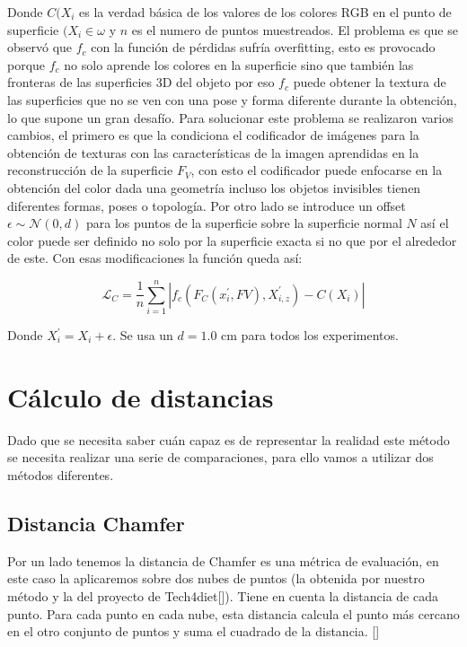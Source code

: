 Donde $C(X_{i}$ es la verdad básica de los valores de los colores RGB en el punto de superficie $(X_{i} \in \omega$ y $n$ es el numero de puntos muestreados. El problema es que se observó que $f_{c}$ con la función de pérdidas sufría overfitting, esto es provocado porque $f_{c}$ no solo aprende los colores en la superficie sino que también las fronteras de las superficies 3D del objeto por eso $f_{c}$ puede obtener la textura de las  superficies que no se ven con una pose y forma diferente durante la obtención, lo que supone un gran desafío. Para solucionar este problema se realizaron varios cambios, el primero es que la condiciona el codificador de imágenes para la obtención de texturas con las características de la imagen aprendidas en la reconstrucción de la superficie $F_{V}$, con esto el codificador puede enfocarse en la obtención del color dada una geometría incluso los objetos invisibles tienen diferentes formas, poses o topología. Por otro lado se introduce un offset $\epsilon \sim \mathcal{N}(0, d)$ para los puntos de la superficie sobre la superficie normal $N$ así el color puede ser definido no solo por la superficie exacta si no que por el alrededor de este. Con esas modificaciones la función queda así:

\begin{equation}
	\label{eq:5}
	\mathcal{L}_{C} = \frac{1}{n} 
	\sum_{i=1}^{n} | f_{c} (F_{C}(x_{i}^{'}, F{V}), X_{i,z}^{'}) - C(X_{i}) |
\end{equation}

Donde $ X_{i}^{'} = X_{i} + \epsilon$. Se usa un $d = 1.0$ cm para todos los experimentos.

\section{Cálculo de distancias}

Dado que se necesita saber cuán capaz es de representar la realidad este método se necesita realizar una serie de comparaciones, para ello vamos a utilizar dos métodos diferentes.

\subsection{Distancia Chamfer}
Por un lado tenemos la distancia de Chamfer es una métrica de evaluación, en este caso la aplicaremos sobre dos nubes de puntos (la obtenida por nuestro método y la del proyecto de Tech4diet[\cite{tech}]). Tiene en cuenta la distancia de cada punto. Para cada punto en cada nube, esta distancia calcula el punto más cercano en el otro conjunto de puntos y suma el cuadrado de la distancia. [\cite{linyi_2022}]


